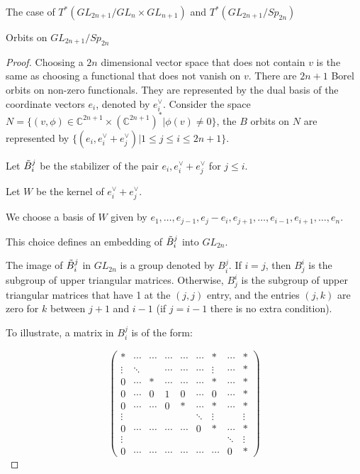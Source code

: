 \documentclass[12pt]{article}
\newcommand{\C}{\mathbb{C}}
\theoremstyle{plain}
\theoremstyle{definition}
\begin{document}
\begin{subsection}{The case of $T^*(GL_{2n+1}/GL_n\times GL_{n+1})$ and $T^*(GL_{2n+1}/Sp_{2n})$}
\begin{subsubsection}{Orbits on $GL_{2n+1}/Sp_{2n}$}
\begin{proof}
Choosing a $2n$ dimensional vector space that does not contain $v$ is the same as choosing a functional that does not vanish on $v$. There are $2n+1$ Borel orbits on non-zero functionals. They are represented by the dual basis of the coordinate vectors $e_i$, denoted by $e_i^\vee$. Consider the space $N=\{(v,\phi)\in \C^{2n+1}\times (\C^{2n+1})^*|\phi(v)\neq 0\}$, the $B$ orbits on $N$ are represented by $\{(e_i,e_i^\vee+e_j^\vee)|1\leq j\leq i\leq 2n+1\}$. 

Let $\Tilde{B}_i^j$ be the stabilizer of the pair $e_i,e_i^\vee+e_j^\vee$ for $j\leq i$.

Let $W$ be the kernel of $e_i^\vee+e_j^\vee$.

We choose a basis of $W$ given by $e_1,\ldots,e_{j-1},e_{j}-e_{i},e_{j+1},\ldots,e_{i-1},e_{i+1},\ldots,e_n$.

This choice defines an embedding of $\Tilde{B}_i^j$ into $GL_{2n}$. 

The image of $\Tilde{B}_i^j$ in $GL_{2n}$ is a group denoted by $B_i^j$. If $i=j$, then $B^i_j$ is the subgroup of upper triangular matrices. Otherwise, $B^i_j$ is the subgroup of upper triangular matrices that have 1 at the $(j,j)$ entry, and the entries $(j,k)$ are zero for $k$ between $j+1$ and $i-1$ (if $j=i-1$ there is no extra condition). 

To illustrate, a matrix in $B_i^j$ is of the form:

$$\begin{pmatrix}
    * & \cdots & \cdots &\cdots & \cdots& \cdots& * &  \cdots & * \\
    \vdots & \ddots & & \cdots & \cdots&\cdots & \vdots & \cdots & * \\
        0 & \cdots  &  *& \cdots& \cdots &\cdots &   * &  \cdots  & * \\

    0 & \cdots & 0 & 1&0 & \cdots & 0 & \cdots & * \\

    0 & \cdots & \cdots & 0&* & \cdots & * & \cdots & * \\

    
    \vdots & & & &  & \ddots & \vdots &  &\vdots \\
    0 & \cdots & \cdots& \cdots & \cdots & 0 & * & \cdots & * \\
    \vdots & & & && & & \ddots & \vdots \\
    0 & \cdots & \cdots& \cdots & \cdots & \cdots & \cdots & 0 & *
\end{pmatrix}
$$


\end{proof}
\end{subsubsection}
\end{subsection}
\end{document}
